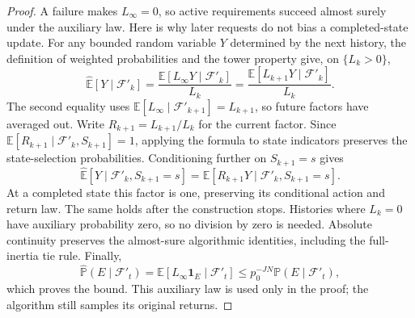\begin{proof}
A failure makes $L_\infty=0$, so active requirements succeed almost surely under the auxiliary law. Here is why later requests do not bias a completed-state update. For any bounded random variable $Y$ determined by the next history, the definition of weighted probabilities and the tower property give, on $\{L_k>0\}$,
\[
\widehat{\mathbb E}[Y\mid\mathcal F'_k]
=\frac{\mathbb E[L_\infty Y\mid\mathcal F'_k]}{L_k}
=\frac{\mathbb E[L_{k+1}Y\mid\mathcal F'_k]}{L_k}.
\]
The second equality uses $\mathbb E[L_\infty\mid\mathcal F'_{k+1}]=L_{k+1}$, so future factors have averaged out. Write $R_{k+1}=L_{k+1}/L_k$ for the current factor. Since $\mathbb E[R_{k+1}\mid\mathcal F'_k,S_{k+1}]=1$, applying the formula to state indicators preserves the state-selection probabilities. Conditioning further on $S_{k+1}=s$ gives
\[
\widehat{\mathbb E}[Y\mid\mathcal F'_k,S_{k+1}=s]
=\mathbb E[R_{k+1}Y\mid\mathcal F'_k,S_{k+1}=s].
\]
At a completed state this factor is one, preserving its conditional action and return law. The same holds after the construction stops. Histories where $L_k=0$ have auxiliary probability zero, so no division by zero is needed. Absolute continuity preserves the almost-sure
algorithmic identities, including the full-inertia tie rule. Finally,
\[
\widehat{\mathbb P}(E\mid\mathcal F'_t)=\mathbb E[L_\infty\mathbf1_E\mid\mathcal F'_t]
\le p_0^{-JN}\mathbb P(E\mid\mathcal F'_t),
\]
which proves the bound. This auxiliary law is used only in the proof; the algorithm still
samples its original returns.
\end{proof}
